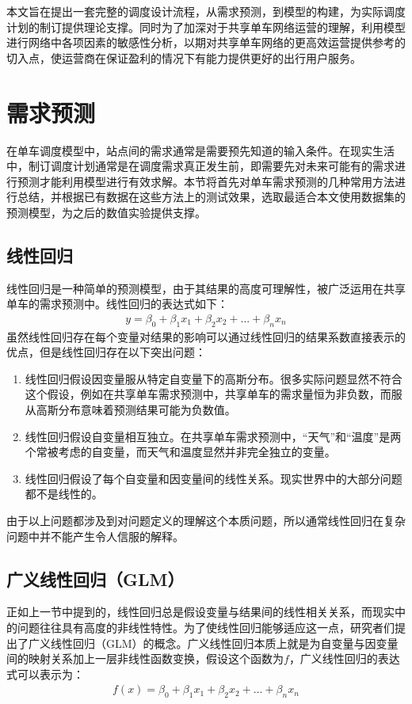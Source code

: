 \documentclass[]{tongjithesis}
\numberwithin{equation}{chapter}
\begin{document}
本文旨在提出一套完整的调度设计流程，从需求预测，到模型的构建，为实际调度计划的制订提供理论支撑。同时为了加深对于共享单车网络运营的理解，利用模型进行网络中各项因素的敏感性分析，以期对共享单车网络的更高效运营提供参考的切入点，使运营商在保证盈利的情况下有能力提供更好的出行用户服务。

\clearpage

\chapter{需求预测}
在单车调度模型中，站点间的需求通常是需要预先知道的输入条件。在现实生活中，制订调度计划通常是在调度需求真正发生前，即需要先对未来可能有的需求进行预测才能利用模型进行有效求解。本节将首先对单车需求预测的几种常用方法进行总结，并根据已有数据在这些方法上的测试效果，选取最适合本文使用数据集的预测模型，为之后的数值实验提供支撑。
\section{线性回归}
线性回归是一种简单的预测模型，由于其结果的高度可理解性，被广泛运用在共享单车的需求预测中。线性回归的表达式如下：
\begin{align}
	y = \beta_{0}+\beta_{1}x_{1}+\beta_{2}x_{2}+...+\beta_{n}x_{n}
\end{align}
\noindent
虽然线性回归存在每个变量对结果的影响可以通过线性回归的结果系数直接表示的优点，但是线性回归存在以下突出问题：
\begin{enumerate}
	\item 线性回归假设因变量服从特定自变量下的高斯分布。很多实际问题显然不符合这个假设，例如在共享单车需求预测中，共享单车的需求量恒为非负数，而服从高斯分布意味着预测结果可能为负数值。
	\item 线性回归假设自变量相互独立。在共享单车需求预测中，“天气”和“温度”是两个常被考虑的自变量，而天气和温度显然并非完全独立的变量。
	\item 线性回归假设了每个自变量和因变量间的线性关系。现实世界中的大部分问题都不是线性的。
\end{enumerate}

由于以上问题都涉及到对问题定义的理解这个本质问题，所以通常线性回归在复杂问题中并不能产生令人信服的解释。

\section{广义线性回归（GLM）}
正如上一节中提到的，线性回归总是假设变量与结果间的线性相关关系，而现实中的问题往往具有高度的非线性特性。为了使线性回归能够适应这一点，研究者们提出了广义线性回归（GLM）的概念。广义线性回归本质上就是为自变量与因变量间的映射关系加上一层非线性函数变换，假设这个函数为$f$，广义线性回归的表达式可以表示为：
\begin{align}
	f(x) = \beta_{0}+\beta_{1}x_{1}+\beta_{2}x_{2}+...+\beta_{n}x_{n}
\end{align}
\end{document}
